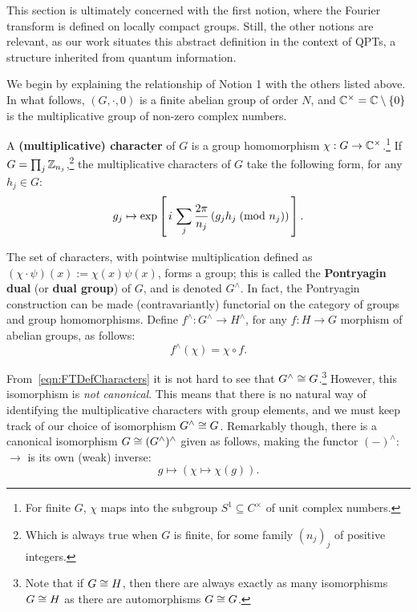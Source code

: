 This section is ultimately concerned with the first notion, where the Fourier transform is defined on locally compact groups. Still, the other notions are relevant, as our work situates this abstract definition in the context of QPTs, a structure inherited from quantum information. 

We begin by explaining the relationship of Notion 1 with the others listed above. In what follows, $(G,\cdot,0)$ is a finite abelian group of order $N$, and $\mathbb{C}^{\times}=\mathbb{C}\setminus\{0\}$ is the multiplicative group of non-zero complex numbers.

A \textbf{(multiplicative) character} of $G$ is a group homomorphism $\chi:G\to \mathbb{C}^\times$.\footnote{For finite $G$, $\chi$ maps into the subgroup $S^1 \subseteq C^\times$ of unit complex numbers.} If $G = \prod_j \mathbb{Z}_{n_j}$,\footnote{Which is always true when $G$ is finite, for some family $(n_j)_j$ of positive integers.} the multiplicative characters of $G$ take the following form, for any $h_j \in G$:
\begin{equation}
\label{eqn:FTDefCharacters}
  g_j \mapsto \exp\left[\, i \, \sum_j \frac{2 \pi}{n_j} \left(g_jh_j \; (\text{mod } n_j)\right) \, \right].
\end{equation}

The set of characters, with pointwise multiplication defined as $(\chi\cdot\psi)(x):=\chi(x)\psi(x)$, forms a group; this is called the \textbf{Pontryagin dual} (or \textbf{dual group}) of $G$, and is denoted $G^\wedge$. In fact, the Pontryagin construction can be made (contravariantly) functorial on the category  of groups and group homomorphisms. Define $f^\wedge : G^\wedge \rightarrow H^\wedge$, for any $f: H \rightarrow G$ morphism of abelian groups, as follows:
\begin{equation*}
  f^\wedge( \chi ) = \chi \circ f.
\end{equation*}

From~\eqref{eqn:FTDefCharacters} it is not hard to see that $G^\wedge \cong G$.\footnote{Note that if $G \cong H$, then there are always exactly as many isomorphisms $G \cong H$ as there are automorphisms $G \cong G$.} However, this isomorphism is \emph{not canonical}. This means that there is no natural way of identifying the multiplicative characters with group elements, and we must keep track of our choice of isomorphism $G^\wedge \cong G$. Remarkably though, there is a canonical isomorphism $G \cong (G^\wedge)^\wedge$ given as follows, making the functor $(-)^{\wedge}:$  $\to$  is its own (weak) inverse:
\begin{equation*}
  g \mapsto (\chi \mapsto \chi(g)).
\end{equation*}

